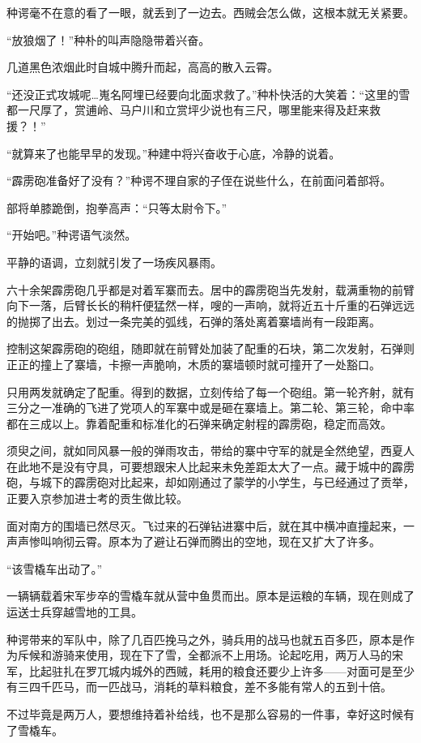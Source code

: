 种谔毫不在意的看了一眼，就丢到了一边去。西贼会怎么做，这根本就无关紧要。

“放狼烟了！”种朴的叫声隐隐带着兴奋。

几道黑色浓烟此时自城中腾升而起，高高的散入云霄。

“还没正式攻城呢…嵬名阿埋已经要向北面求救了。”种朴快活的大笑着：“这里的雪都一尺厚了，赏逋岭、马户川和立赏坪少说也有三尺，哪里能来得及赶来救援？！”

“就算来了也能早早的发现。”种建中将兴奋收于心底，冷静的说着。

“霹雳砲准备好了没有？”种谔不理自家的子侄在说些什么，在前面问着部将。

部将单膝跪倒，抱拳高声：“只等太尉令下。”

“开始吧。”种谔语气淡然。

平静的语调，立刻就引发了一场疾风暴雨。

六十余架霹雳砲几乎都是对着军寨而去。居中的霹雳砲当先发射，载满重物的前臂向下一落，后臂长长的稍杆便猛然一样，嗖的一声响，就将近五十斤重的石弹远远的抛掷了出去。划过一条完美的弧线，石弹的落处离着寨墙尚有一段距离。

控制这架霹雳砲的砲组，随即就在前臂处加装了配重的石块，第二次发射，石弹则正正的撞上了寨墙，卡擦一声脆响，木质的寨墙顿时就可撞开了一处豁口。

只用两发就确定了配重。得到的数据，立刻传给了每一个砲组。第一轮齐射，就有三分之一准确的飞进了党项人的军寨中或是砸在寨墙上。第二轮、第三轮，命中率都在三成以上。靠着配重和标准化的石弹来确定射程的霹雳砲，稳定而高效。

须臾之间，就如同风暴一般的弹雨攻击，带给的寨中守军的就是全然绝望，西夏人在此地不是没有守具，可要想跟宋人比起来未免差距太大了一点。藏于城中的霹雳砲，与城下的霹雳砲对比起来，却如刚通过了蒙学的小学生，与已经通过了贡举，正要入京参加进士考的贡生做比较。

面对南方的围墙已然尽灭。飞过来的石弹钻进寨中后，就在其中横冲直撞起来，一声声惨叫响彻云霄。原本为了避让石弹而腾出的空地，现在又扩大了许多。

“该雪橇车出动了。”

一辆辆载着宋军步卒的雪橇车就从营中鱼贯而出。原本是运粮的车辆，现在则成了运送士兵穿越雪地的工具。

种谔带来的军队中，除了几百匹挽马之外，骑兵用的战马也就五百多匹，原本是作为斥候和游骑来使用，现在下了雪，全都派不上用场。论起吃用，两万人马的宋军，比起驻扎在罗兀城内城外的西贼，耗用的粮食还要少上许多——对面可是至少有三四千匹马，而一匹战马，消耗的草料粮食，差不多能有常人的五到十倍。

不过毕竟是两万人，要想维持着补给线，也不是那么容易的一件事，幸好这时候有了雪橇车。

